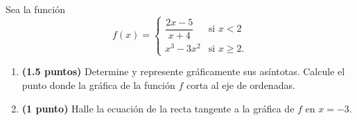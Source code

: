 
Sea la función
\[
f(x)=\begin{cases}
\dfrac{2x-5}{x+4} & \text{si }x<2\\[6pt]
x^3-3x^2 & \text{si }x\geq2.
\end{cases}
\]
\begin{enumerate}[label=\alph*)]
\item \textbf{(1.5 puntos)} Determine y represente gráficamente sus asíntotas. Calcule el punto donde la gráfica de la función $f$ corta al eje de ordenadas.
\item \textbf{(1 punto)} Halle la ecuación de la recta tangente a la gráfica de $f$ en $x=-3$.
\end{enumerate}

